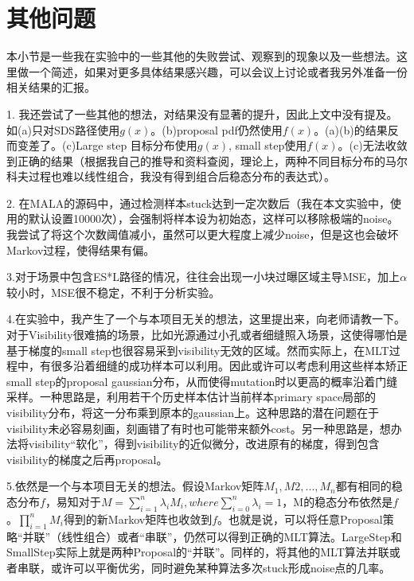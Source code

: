 \section{其他问题}

本小节是一些我在实验中的一些其他的失败尝试、观察到的现象以及一些想法。这里做一个简述，如果对更多具体结果感兴趣，可以会议上讨论或者我另外准备一份相关结果的汇报。

1. 我还尝试了一些其他的想法，对结果没有显著的提升，因此上文中没有提及。如(a)只对SDS路径使用$g(x)$。(b)proposal pdf仍然使用$f(x)$。(a)(b)的结果反而变差了。(c)Large step 目标分布使用$g(x)$, small step使用$f(x)$。(c)无法收敛到正确的结果（根据我自己的推导和资料查阅，理论上，两种不同目标分布的马尔科夫过程也难以线性组合，我没有得到组合后稳态分布的表达式）。

2. 在MALA的源码中，通过检测样本stuck达到一定次数后（我在本文实验中，使用的默认设置10000次），会强制将样本设为初始态，这样可以移除极端的noise。我尝试了将这个次数阈值减小，虽然可以更大程度上减少noise，但是这也会破坏Markov过程，使得结果有偏。

3.对于场景中包含ES*L路径的情况，往往会出现一小块过曝区域主导MSE，加上$\alpha$较小时，MSE很不稳定，不利于分析实验。

4.在实验中，我产生了一个与本项目无关的想法，这里提出来，向老师请教一下。对于Visibility很难搞的场景，比如光源通过小孔或者细缝照入场景，这使得哪怕是基于梯度的small step也很容易采到visibility无效的区域。然而实际上，在MLT过程中，有很多沿着细缝的成功样本可以利用。因此或许可以考虑利用这些样本矫正small step的proposal gaussian分布，从而使得mutation时以更高的概率沿着门缝采样。一种思路是，利用若干个历史样本估计当前样本primary space局部的visibility分布，将这一分布乘到原本的gaussian上。这种思路的潜在问题在于visibility未必容易刻画，刻画错了有时也可能带来额外cost。另一种思路是，想办法将visibility“软化”，得到visibility的近似微分，改进原有的梯度，得到包含visibility的梯度之后再proposal。

5.依然是一个与本项目无关的想法。假设Markov矩阵$M_1, M2, ...,M_n$都有相同的稳态分布$f$，易知对于$M=\sum_{i=1}^n \lambda_iM_i, where \sum_{i=0}^n \lambda_i = 1$，M的稳态分布依然是$f$。$\prod_{i=1}^n M_i$得到的新Markov矩阵也收敛到$f$。也就是说，可以将任意Proposal策略“并联”（线性组合）或者“串联”，仍然可以得到正确的MLT算法。LargeStep和SmallStep实际上就是两种Proposal的“并联”。同样的，将其他的MLT算法并联或者串联，或许可以平衡优劣，同时避免某种算法多次stuck形成noise点的几率。

\label{sec:otherTopic}
